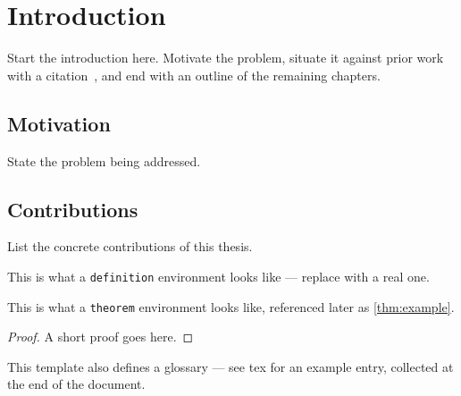 \chapter{Introduction}
\label{chap:introduction}

Start the introduction here. Motivate the problem, situate it against
prior work with a citation~\cite{knuth1984texbook}, and end with an
outline of the remaining chapters.

\section{Motivation}
State the problem being addressed.

\section{Contributions}
List the concrete contributions of this thesis.

\begin{definition}
\label{def:example}
This is what a \texttt{definition} environment looks like — replace with a
real one.
\end{definition}

\begin{theorem}
\label{thm:example}
This is what a \texttt{theorem} environment looks like, referenced later as
\cref{thm:example}.
\end{theorem}

\begin{proof}
A short proof goes here.
\end{proof}

This template also defines a glossary — see \gls{tex} for an example entry,
collected at the end of the document.
